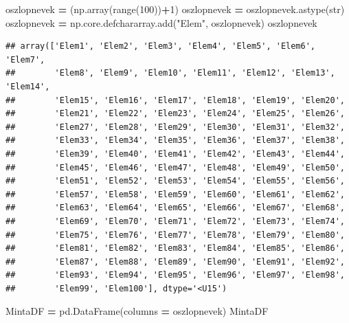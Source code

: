 \documentclass[
]{book}
\newenvironment{Shaded}{\begin{snugshade}}{\end{snugshade}}
\newcommand{\BuiltInTok}[1]{#1}
\newcommand{\DecValTok}[1]{\textcolor[rgb]{0.00,0.00,0.81}{#1}}
\newcommand{\NormalTok}[1]{#1}
\newcommand{\OperatorTok}[1]{\textcolor[rgb]{0.81,0.36,0.00}{\textbf{#1}}}
\newcommand{\StringTok}[1]{\textcolor[rgb]{0.31,0.60,0.02}{#1}}
\begin{document}
\begin{Shaded}
\begin{Highlighting}[]
\NormalTok{oszlopnevek }\OperatorTok{=}\NormalTok{ (np.array(}\BuiltInTok{range}\NormalTok{(}\DecValTok{100}\NormalTok{))}\OperatorTok{+}\DecValTok{1}\NormalTok{)}
\NormalTok{oszlopnevek }\OperatorTok{=}\NormalTok{ oszlopnevek.astype(}\BuiltInTok{str}\NormalTok{)}
\NormalTok{oszlopnevek }\OperatorTok{=}\NormalTok{ np.core.defchararray.add(}\StringTok{"Elem"}\NormalTok{, oszlopnevek)}
\NormalTok{oszlopnevek}
\end{Highlighting}
\end{Shaded}

\begin{verbatim}
## array(['Elem1', 'Elem2', 'Elem3', 'Elem4', 'Elem5', 'Elem6', 'Elem7',
##        'Elem8', 'Elem9', 'Elem10', 'Elem11', 'Elem12', 'Elem13', 'Elem14',
##        'Elem15', 'Elem16', 'Elem17', 'Elem18', 'Elem19', 'Elem20',
##        'Elem21', 'Elem22', 'Elem23', 'Elem24', 'Elem25', 'Elem26',
##        'Elem27', 'Elem28', 'Elem29', 'Elem30', 'Elem31', 'Elem32',
##        'Elem33', 'Elem34', 'Elem35', 'Elem36', 'Elem37', 'Elem38',
##        'Elem39', 'Elem40', 'Elem41', 'Elem42', 'Elem43', 'Elem44',
##        'Elem45', 'Elem46', 'Elem47', 'Elem48', 'Elem49', 'Elem50',
##        'Elem51', 'Elem52', 'Elem53', 'Elem54', 'Elem55', 'Elem56',
##        'Elem57', 'Elem58', 'Elem59', 'Elem60', 'Elem61', 'Elem62',
##        'Elem63', 'Elem64', 'Elem65', 'Elem66', 'Elem67', 'Elem68',
##        'Elem69', 'Elem70', 'Elem71', 'Elem72', 'Elem73', 'Elem74',
##        'Elem75', 'Elem76', 'Elem77', 'Elem78', 'Elem79', 'Elem80',
##        'Elem81', 'Elem82', 'Elem83', 'Elem84', 'Elem85', 'Elem86',
##        'Elem87', 'Elem88', 'Elem89', 'Elem90', 'Elem91', 'Elem92',
##        'Elem93', 'Elem94', 'Elem95', 'Elem96', 'Elem97', 'Elem98',
##        'Elem99', 'Elem100'], dtype='<U15')
\end{verbatim}

\begin{Shaded}
\begin{Highlighting}[]
\NormalTok{MintaDF }\OperatorTok{=}\NormalTok{ pd.DataFrame(columns }\OperatorTok{=}\NormalTok{ oszlopnevek)}
\NormalTok{MintaDF}
\end{Highlighting}
\end{Shaded}
\end{document}
